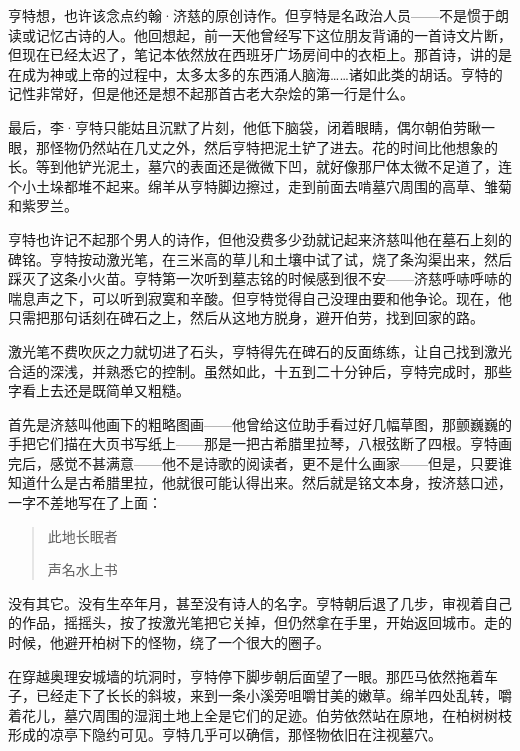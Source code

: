 \documentclass[AutoFakeBold=true]{book}
\begin{document}
亨特想，也许该念点约翰·济慈的原创诗作。但亨特是名政治人员——不是惯于朗读或记忆古诗的人。他回想起，前一天他曾经写下这位朋友背诵的一首诗文片断，但现在已经太迟了，笔记本依然放在西班牙广场房间中的衣柜上。那首诗，讲的是在成为神或上帝的过程中，太多太多的东西涌人脑海……诸如此类的胡话。亨特的记性非常好，但是他还是想不起那首古老大杂烩的第一行是什么。

最后，李·亨特只能姑且沉默了片刻，他低下脑袋，闭着眼睛，偶尔朝伯劳瞅一眼，那怪物仍然站在几丈之外，然后亨特把泥土铲了进去。花的时间比他想象的长。等到他铲光泥土，墓穴的表面还是微微下凹，就好像那尸体太微不足道了，连个小土垛都堆不起来。绵羊从亨特脚边擦过，走到前面去啃墓穴周围的高草、雏菊和紫罗兰。

亨特也许记不起那个男人的诗作，但他没费多少劲就记起来济慈叫他在墓石上刻的碑铭。亨特按动激光笔，在三米高的草儿和土壤中试了试，烧了条沟渠出来，然后踩灭了这条小火苗。亨特第一次听到墓志铭的时候感到很不安——济慈呼哧呼哧的喘息声之下，可以听到寂寞和辛酸。但亨特觉得自己没理由要和他争论。现在，他只需把那句话刻在碑石之上，然后从这地方脱身，避开伯劳，找到回家的路。

激光笔不费吹灰之力就切进了石头，亨特得先在碑石的反面练练，让自己找到激光合适的深浅，并熟悉它的控制。虽然如此，十五到二十分钟后，亨特完成时，那些字看上去还是既简单又粗糙。

首先是济慈叫他画下的粗略图画——他曾给这位助手看过好几幅草图，那颤巍巍的手把它们描在大页书写纸上——那是一把古希腊里拉琴，八根弦断了四根。亨特画完后，感觉不甚满意——他不是诗歌的阅读者，更不是什么画家——但是，只要谁知道什么是古希腊里拉，他就很可能认得出来。然后就是铭文本身，按济慈口述，一字不差地写在了上面：

\begin{quote}
	\begin{center}
		{\heiti 此地长眠者

		声名水上书}
	\end{center}
\end{quote}

没有其它。没有生卒年月，甚至没有诗人的名字。亨特朝后退了几步，审视着自己的作品，摇摇头，按了按激光笔把它关掉，但仍然拿在手里，开始返回城市。走的时候，他避开柏树下的怪物，绕了一个很大的圈子。

在穿越奥理安城墙的坑洞时，亨特停下脚步朝后面望了一眼。那匹马依然拖着车子，已经走下了长长的斜坡，来到一条小溪旁咀嚼甘美的嫩草。绵羊四处乱转，嚼着花儿，墓穴周围的湿润土地上全是它们的足迹。伯劳依然站在原地，在柏树树枝形成的凉亭下隐约可见。亨特几乎可以确信，那怪物依旧在注视墓穴。

\vspace*{1em}
\end{document}
